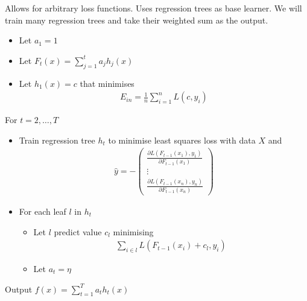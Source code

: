 \documentclass{article}
\begin{document}
  Allows for arbitrary loss functions. Uses regression trees as base learner. We will train many regression trees and take their weighted sum as the output.
  
  \begin{itemize}
    \item Let $a_1 = 1$
    \item Let $F_t(x) = \sum_{j=1}^{t}{a_j h_j(x)}$
    \item Let $h_1(x) = c$ that minimises \begin{align}
        E_{in} = \frac{1}{n}\sum_{i=1}^{n}{L(c, y_i)}
    \end{align}
    \end{itemize}
    
    For $t = 2, \dots, T$
    
    \begin{itemize}
        \item Train regression tree $h_t$ to minimise least squares loss with data $X$ and \begin{align}
            \hat{y} = -\begin{pmatrix}
      \frac{\partial L (F_{t-1}(x_1), y_1)}{\partial F_{t-1}(x_1)} \\
      \vdots \\
      \frac{\partial L (F_{t-1}(x_n), y_n)}{\partial F_{t-1}(x_n)}
    \end{pmatrix}
        \end{align}
        \item For each leaf $l$ in $h_t$ \begin{itemize}
            \item Let $l$ predict value $c_l$ minimising \begin{align}
                \sum_{i \in l}{L(F_{t-1}(x_i) + c_l, y_i)}
            \end{align}
            \item Let $a_t = \eta$
        \end{itemize}
    \end{itemize}
    
    Output $f(x) = \sum_{t=1}^{T}{a_t h_t(x)}$
  
\end{document}
